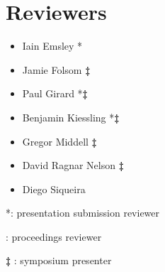 \documentclass[final]{anthology-ch} %
\begin{document}
\section*{Reviewers}

\begin{itemize}
    \item Iain Emsley *
    \item Jamie Folsom \textbf{\textdagger}\textbf{‡} 
    \item Paul Girard *\textbf{‡} 
    \item Benjamin Kiessling *\textbf{‡} 
    \item Gregor Middell \textbf{\textdagger}\textbf{‡} 
    \item David Ragnar Nelson \textbf{\textdagger}\textbf{‡}
    \item Diego Siqueira \textbf{\textdagger}
\end{itemize}

*: presentation submission reviewer

\textbf{\textdagger}:  proceedings reviewer

\textbf{‡} : symposium presenter
\end{document}
